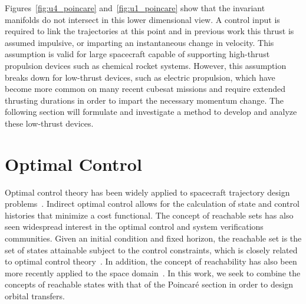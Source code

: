 Figures~\ref{fig:u4_poincare} and~\ref{fig:u1_poincare} show that the invariant manifolds do not intersect in this lower dimensional view. 
A control input is required to link the trajectories at this point and in previous work this thrust is assumed impulsive, or imparting an instantaneous change in velocity. 
This assumption is valid for large spacecraft capable of supporting high-thrust propulsion devices such as chemical rocket systems.
However, this assumption breaks down for low-thrust devices, such as electric propulsion, which have become more common on many recent cubesat missions and require extended thrusting durations in order to impart the necessary momentum change.
The following section will formulate and investigate a method to develop and analyze these low-thrust devices.
\section{Optimal Control}\label{sec:opt}
Optimal control theory has been widely applied to spacecraft trajectory design problems~\cite{peng2014,yue2009}.
Indirect optimal control allows for the calculation of state and control histories that minimize a cost functional. 
The concept of reachable sets has also seen widespread interest in the optimal control and system verifications communities. 
Given an initial condition and fixed horizon, the reachable set is the set of states attainable subject to the control constraints, which is closely related to optimal control theory~\cite{lygeros2004,lygeros2002,mitchell2002}.
In addition, the concept of reachability has also been more recently applied to the space domain~\cite{holzinger2012,holzinger2011,komendera2012a}. 
In this work, we seek to combine the concepts of reachable states with that of the Poincar\'e section in order to design orbital transfers.


